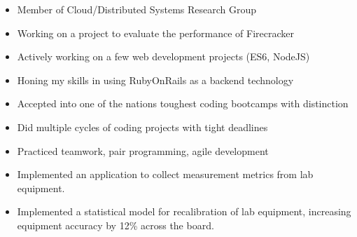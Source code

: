 \documentclass[10pt,a4paper]{altacv}
\begin{document}


\begin{fullwidth}
\makecvheader
\end{fullwidth}



\begin{itemize}
\item \justifying Member of Cloud/Distributed Systems Research Group
\item \justifying Working on a project to evaluate the performance of Firecracker
\end{itemize}

\divider

\begin{itemize}
\item \justifying Actively working on a few web development projects (ES6, NodeJS)
\item \justifying Honing my skills in using RubyOnRails as a backend technology
\end{itemize}

\divider

\begin{itemize}
\item \justifying Accepted into one of the nations toughest coding bootcamps with distinction
\item \justifying Did multiple cycles of coding projects with tight deadlines
\item \justifying Practiced teamwork, pair programming, agile development
\end{itemize}

\divider

\begin{itemize}
\item \justifying Implemented an application to collect measurement metrics from lab equipment.
\item \justifying Implemented a statistical model for recalibration of lab equipment, increasing equipment accuracy by 12\% across the board.
\end{itemize}
\end{document}
